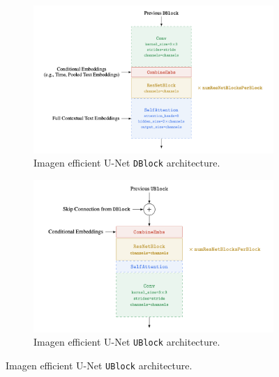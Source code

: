 \begin{figure}
    \centering
    \begin{subfigure}[b]{0.5\textwidth}   
        \centering 
        \includegraphics[width=\textwidth]{images/appendix/imagen/dblock.png}
        \caption[]%
        {{\small Imagen efficient U-Net \texttt{DBlock} architecture.}}
    \end{subfigure}
    \hfill
    \begin{subfigure}[b]{0.475\textwidth}
        \centering
        \includegraphics[width=\textwidth]{images/appendix/imagen/ublock.png}
        \caption[]%
        {{\small Imagen efficient U-Net \texttt{UBlock} architecture.}}
    \end{subfigure}
\end{figure}















